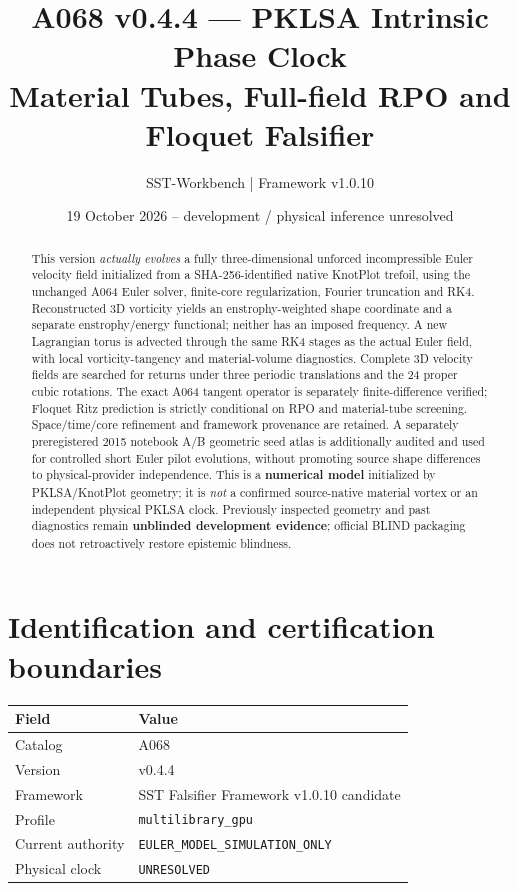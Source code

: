 \documentclass[11pt,a4paper]{article}
\title{A068 v0.4.4 --- PKLSA Intrinsic Phase Clock\\Material Tubes, Full-field RPO and Floquet Falsifier}
\author{SST-Workbench | Framework v1.0.10}
\date{19 October 2026 -- development / physical inference unresolved}
\begin{document}
\maketitle
\begin{abstract}
This version \emph{actually evolves} a fully three-dimensional unforced incompressible Euler velocity field initialized from a SHA-256-identified native KnotPlot trefoil, using the unchanged A064 Euler solver, finite-core regularization, Fourier truncation and RK4. Reconstructed 3D vorticity yields an enstrophy-weighted shape coordinate and a separate enstrophy/energy functional; neither has an imposed frequency. A new Lagrangian torus is advected through the same RK4 stages as the actual Euler field, with local vorticity-tangency and material-volume diagnostics. Complete 3D velocity fields are searched for returns under three periodic translations and the 24 proper cubic rotations. The exact A064 tangent operator is separately finite-difference verified; Floquet Ritz prediction is strictly conditional on RPO and material-tube screening. Space/time/core refinement and framework provenance are retained. A separately preregistered 2015 notebook A/B geometric seed atlas is additionally audited and used for controlled short Euler pilot evolutions, without promoting source shape differences to physical-provider independence. This is a \textbf{numerical model} initialized by PKLSA/KnotPlot geometry; it is \emph{not} a confirmed source-native material vortex or an independent physical PKLSA clock. Previously inspected geometry and past diagnostics remain \textbf{unblinded development evidence}; official BLIND packaging does not retroactively restore epistemic blindness.
\end{abstract}

\section{Identification and certification boundaries}
\begin{tabular}{ll}
\toprule Field & Value\\\midrule
Catalog & A068\\ Version & v0.4.4\\ Framework & SST Falsifier Framework v1.0.10 candidate\\
Profile & \texttt{multilibrary\_gpu}\\ Current authority & \texttt{EULER\_MODEL\_SIMULATION\_ONLY}\\
Physical clock & \texttt{UNRESOLVED}\\ \bottomrule
\end{tabular}
\end{document}
